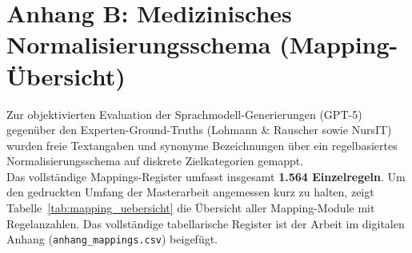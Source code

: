 \section*{Anhang B: Medizinisches Normalisierungsschema (Mapping-Übersicht)}
Zur objektivierten Evaluation der Sprachmodell-Generierungen (GPT-5) gegenüber den Experten-Ground-Truths (Lohmann \& Rauscher sowie NursIT) wurden freie Textangaben und synonyme Bezeichnungen über ein regelbasiertes Normalisierungsschema auf diskrete Zielkategorien gemappt.\\[1em]
Das vollständige Mappings-Register umfasst insgesamt \textbf{1.564 Einzelregeln}. Um den gedruckten Umfang der Masterarbeit angemessen kurz zu halten, zeigt Tabelle~\ref{tab:mapping_uebersicht} die Übersicht aller Mapping-Module mit Regelanzahlen. Das vollständige tabellarische Register ist der Arbeit im digitalen Anhang (\texttt{anhang\_mappings.csv}) beigefügt.\\[1.5em]
